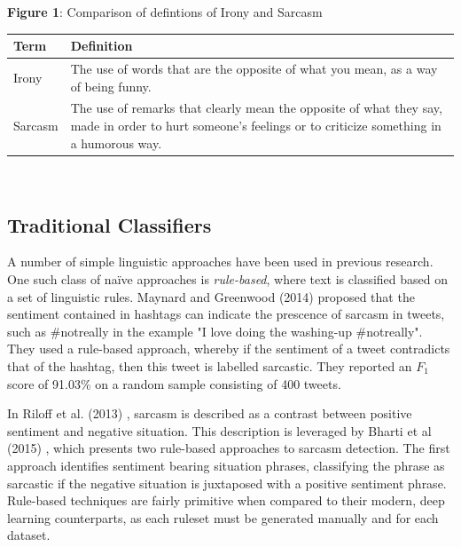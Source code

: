 \documentclass[12pt,a4paper]{article}
\begin{document}
\begin{center}
	\textbf{Figure 1}: Comparison of defintions of Irony and Sarcasm
\end{center}
\begin{center}
\begin{tabular}{p{2cm}p{12cm}}
	\hline\vspace{0.5pt}
	\textbf{Term} & \vspace{0.5pt}\textbf{Definition}\\[1.2ex]
	\hline\hline
	Irony & The use of words that are the opposite of what you mean, as a way of being funny. \cite{cambridgeirony2020}\\
	\hline
	Sarcasm & The use of remarks that clearly mean the opposite of what they say, made in order to hurt someone's feelings or to criticize something in a humorous way. \cite{cambridgesarcasm2020}\\
	\hline
\end{tabular}\\
\end{center}

\subsection{Traditional Classifiers}
\noindent A number of simple linguistic approaches have been used in previous research. One such class of na\"{i}ve approaches is \textit{rule-based}, where text is classified based on a set of linguistic rules. Maynard and Greenwood (2014) \cite{maynard2014cares} proposed that the sentiment contained in hashtags can indicate the prescence of sarcasm in tweets, such as \#notreally in the example "I love doing the washing-up \#notreally". They used a rule-based approach, whereby if the sentiment of a tweet contradicts that of the hashtag, then this tweet is labelled sarcastic. They reported an $F_{1}$ score of 91.03\% on a random sample consisting of 400 tweets.

In Riloff et al. (2013) \cite{riloff2013sarcasm}, sarcasm is described as a contrast between positive sentiment and negative situation. This description is leveraged by Bharti et al (2015) \cite{bharti2015parsing}, which presents two rule-based approaches to sarcasm detection. The first approach identifies sentiment bearing situation phrases, classifying the phrase as sarcastic if the negative situation is juxtaposed with a positive sentiment phrase. Rule-based techniques are fairly primitive when compared to their modern, deep learning counterparts, as each ruleset must be generated manually and for each dataset.
\end{document}

